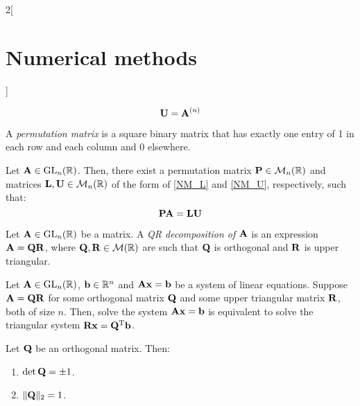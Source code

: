 \documentclass[../../../main.tex]{subfiles}
\begin{document}
\begin{multicols}{2}[\section{Numerical methods}]
\begin{prop}
\begin{enumerate}
$$                      \vb{U}=\vb{A}^{(n)}
                  $$
        \end{enumerate}
    \end{prop}
    \begin{definition}
        A \textit{permutation matrix} is a square binary matrix that has exactly one entry of 1 in each row and each column and 0 elsewhere.
    \end{definition}
    \begin{prop}
        Let $\vb{A}\in\mathrm{GL}_n(\mathbb{R})$. Then, there exist a permutation matrix $\vb{P}\in\mathcal{M}_n(\mathbb{R})$ and matrices $\vb{L},\vb{U}\in\mathcal{M}_n(\mathbb{R})$ of the form of \eqref{NM_L} and \eqref{NM_U}, respectively, such that: $$\vb{P}\vb{A}=\vb{L}\vb{U}$$
    \end{prop}
    \begin{definition}[QR descompostion]
        Let $\vb{A}\in\mathrm{GL}_n(\mathbb{R})$ be a matrix. A \textit{QR decomposition of $\vb{A}$} is an expression $\vb{A}=\vb{Q}\vb{R}$, where $\vb{Q},\vb{R}\in\mathcal{M}(\mathbb{R})$ are such that $\vb{Q}$ is orthogonal and $\vb{R}$ is upper triangular.
    \end{definition}
    \begin{lemma}
        Let $\vb{A}\in\mathrm{GL}_n(\mathbb{R})$, $\vb{b}\in\mathbb{R}^n$ and $\vb{A}\vb{x}=\vb{b}$ be a system of linear equations. Suppose $\vb{A}=\vb{Q}\vb{R}$ for some orthogonal matrix $\vb{Q}$ and some upper triangular matrix $\vb{R}$, both of size $n$. Then, solve the system $\vb{A}\vb{x}=\vb{b}$ is equivalent to solve the triangular system $\vb{R}\vb{x}=\vb{Q}^{\mathrm{T}}\vb{b}$.
    \end{lemma}
    \begin{lemma}
        Let $\vb{Q}$ be an orthogonal matrix. Then:
        \begin{enumerate}
            \item $\det\vb{Q}=\pm 1$.
            \item $\|\vb{Q}\|_2=1$.
        \end{enumerate}
    \end{lemma}
\end{multicols}
\end{document}
